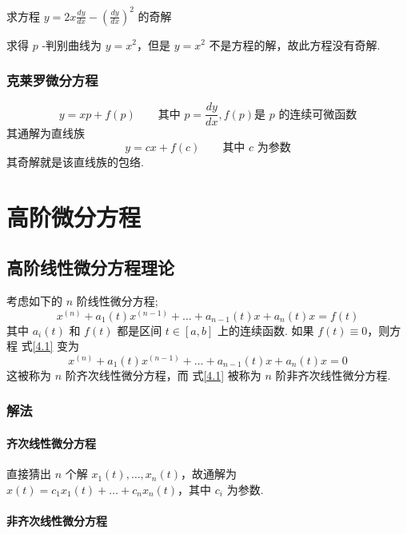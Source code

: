 \begin{example}
    求方程 $\displaystyle y=2x\frac{dy}{dx}-\left( \frac{dy}{dx} \right)^{2}$ 的奇解
\end{example}

求得 $p$ -判别曲线为 $\displaystyle y=x^{2}$，但是 $\displaystyle y=x^{2}$ 不是方程的解，故此方程没有奇解.

\subsubsection{克莱罗微分方程}
$$
    y=xp+f(p)\qquad \text{其中 }p=\frac{dy}{dx},f(p)\text{是 }p\text{ 的连续可微函数}
$$
其通解为直线族
$$
    y=cx+f(c)\qquad \text{其中 }c\text{ 为参数}
$$
其奇解就是该直线族的包络.

\section{高阶微分方程}

\subsection{高阶线性微分方程理论}

考虑如下的 $n$ 阶线性微分方程;
\begin{equation}\label{4.1}
    x^{(n)}+a_{1}(t)x^{(n-1)}+\dots+a_{n-1}(t)x+a_{n}(t)x=f(t)
\end{equation}
其中 $\displaystyle a_{i}(t)$ 和 $\displaystyle f(t)$ 都是区间 $\displaystyle t\in[a,b]$ 上的连续函数. 如果 $\displaystyle f(t)\equiv0$，则方程 式\ref{4.1} 变为
\begin{equation}\label{4.2}
    x^{(n)}+a_{1}(t)x^{(n-1)}+\dots+a_{n-1}(t)x+a_{n}(t)x=0
\end{equation}
这被称为 $n$ 阶齐次线性微分方程，而 式\ref{4.1} 被称为 $n$ 阶非齐次线性微分方程.
\subsubsection{解法}

\paragraph{齐次线性微分方程}

直接猜出 $n$ 个解 $\displaystyle x_{1}(t),\dots,x_{n}(t)$，故通解为 $\displaystyle x(t)=c_{1}x_{1}(t)+\dots+c_{n}x_{n}(t)$，其中 $\displaystyle c_{i}$ 为参数.

\paragraph{非齐次线性微分方程}

